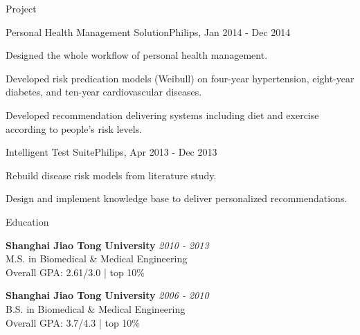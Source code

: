 \documentclass{resume} %
\begin{document}
\begin{rSection}{Project}

\begin{rSubsection}{Personal Health Management Solution}{}{Philips, Jan 2014 - Dec 2014}{}
\item Designed the whole workflow of personal health management.
\item Developed risk predication models (Weibull) on four-year hypertension, eight-year diabetes, and ten-year cardiovascular diseases.
\item Developed recommendation delivering systems including diet and exercise according to people's risk levels.
\end{rSubsection}


\begin{rSubsection}{Intelligent Test Suite}{}{Philips, Apr 2013 - Dec 2013}{}
\item Rebuild disease risk models from literature study.
\item Design and implement knowledge base to deliver personalized recommendations.
\end{rSubsection}

\end{rSection}


\begin{rSection}{Education}

{\bf Shanghai Jiao Tong University} \hfill {\em 2010 - 2013} \\ 
M.S. in Biomedical \& Medical Engineering \\
Overall GPA: 2.61/3.0 | top 10\%

{\bf Shanghai Jiao Tong University} \hfill {\em 2006 - 2010} \\ 
B.S. in Biomedical \& Medical Engineering \\
Overall GPA: 3.7/4.3 | top 10\%

\end{rSection}

\end{document}
